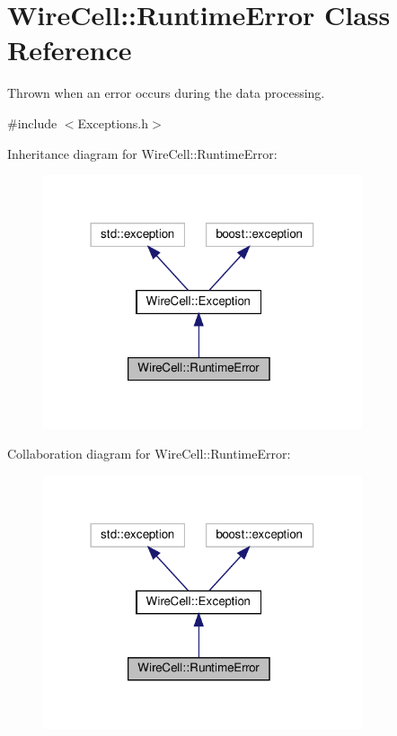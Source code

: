 \hypertarget{class_wire_cell_1_1_runtime_error}{}\section{Wire\+Cell\+:\+:Runtime\+Error Class Reference}
\label{class_wire_cell_1_1_runtime_error}


Thrown when an error occurs during the data processing.  




{\ttfamily \#include $<$Exceptions.\+h$>$}



Inheritance diagram for Wire\+Cell\+:\+:Runtime\+Error\+:
\nopagebreak
\begin{figure}[H]
\begin{center}
\leavevmode
\includegraphics[width=266pt]{class_wire_cell_1_1_runtime_error__inherit__graph}
\end{center}
\end{figure}


Collaboration diagram for Wire\+Cell\+:\+:Runtime\+Error\+:
\nopagebreak
\begin{figure}[H]
\begin{center}
\leavevmode
\includegraphics[width=266pt]{class_wire_cell_1_1_runtime_error__coll__graph}
\end{center}
\end{figure}
